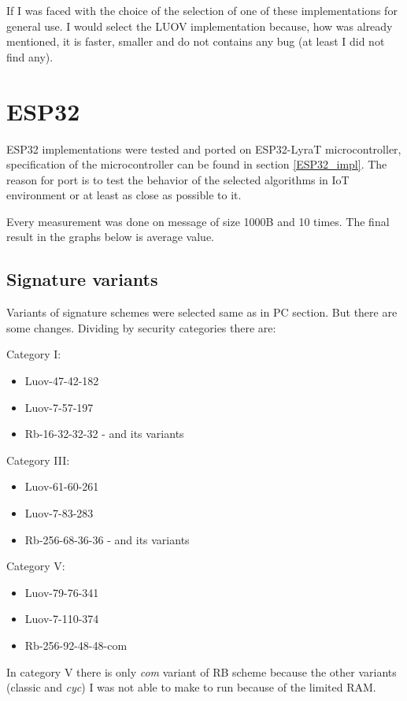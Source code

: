 \documentclass[thesis=M,english]{FITthesis}[2019/12/23]
\begin{document}
\bigskip
\noindent
If I was faced with the choice of the selection of one of these implementations for general use. I would select the LUOV implementation because, how was already mentioned, it is faster, smaller and do not contains any bug (at least I did not find any).

\newpage
\section{ESP32}
ESP32 implementations were tested and ported on ESP32-LyraT microcontroller, specification of the microcontroller can be found in section \ref{ESP32_impl}. The reason for port is to test the behavior of the selected algorithms in IoT environment or at least as close as possible to it.

\bigskip
\noindent
Every measurement was done on message of size 1000B and 10 times. The final result in the graphs below is average value.

\subsection{Signature variants}
Variants of signature schemes were selected same as in PC section. But there are some changes. Dividing by security categories there are:

\bigskip
\noindent
Category I:
\begin{itemize}
\item Luov-47-42-182
\item Luov-7-57-197
\item Rb-16-32-32-32 - and its variants
\end{itemize}

\noindent
Category III:
\begin{itemize}
\item Luov-61-60-261
\item Luov-7-83-283
\item Rb-256-68-36-36 - and its variants
\end{itemize}

\noindent
Category V:
\begin{itemize}
\item Luov-79-76-341
\item Luov-7-110-374
\item Rb-256-92-48-48-com
\end{itemize}

\noindent
In category V there is only \textit{com} variant of RB scheme because the other variants (classic and \textit{cyc}) I was not able to make to run because of the limited RAM.
\end{document}
